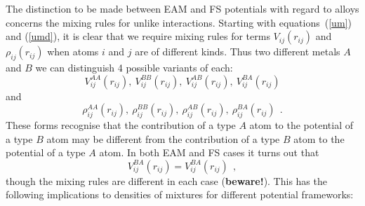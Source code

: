 The distinction to be made between EAM and FS potentials with regard to
alloys concerns the mixing rules for unlike interactions.  Starting with
equations~(\ref{um}) and (\ref{umd}), it is clear that we require mixing
rules for terms $V_{ij}(r_{ij})$ and $\rho_{ij}(r_{ij})$ when atoms $i$
and $j$ are of different kinds.  Thus two different metals $A$ and $B$ we
can distinguish 4 possible variants of each:
\[V^{AA}_{ij}(r_{ij}),~V^{BB}_{ij}(r_{ij}),~V^{AB}_{ij}(r_{ij}),
~V^{BA}_{ij}(r_{ij})\]
and
\[\rho^{AA}_{ij}(r_{ij}),~\rho^{BB}_{ij}(r_{ij}),~\rho^{AB}_{ij}(r_{ij}),
~\rho^{BA}_{ij}(r_{ij})~~.\]
These forms recognise that the contribution of a type $A$ atom to
the potential of a type $B$ atom may be different from the
contribution of a type $B$ atom to the potential of a type $A$ atom.
In both EAM \cite{johnson-89a} and FS \cite{sutton-91a} cases it
turns out that
\begin{equation}
V^{BA}_{ij}(r_{ij})=V^{BA}_{ij}(r_{ij})~~,
\end{equation}
though the mixing rules are different in each case ({\bf beware!}).
This has the following implications to densities of mixtures
for different potential frameworks:
